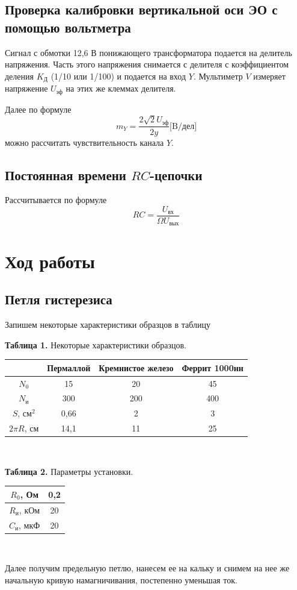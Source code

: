 \documentclass[a4paper, 12pt]{article}%
\begin{document}
\subsection*{Проверка калибровки вертикальной оси ЭО с помощью вольтметра}
Сигнал с обмотки 12,6 В понижающего трансформатора подается на делитель напряжения. Часть этого напряжения снимается с делителя с коэффициентом деления $K_{\text{Д}}$ (1/10 или 1/100) и подается на вход $Y$. Мультиметр $V$ измеряет напряжение $U_{\text{эф}}$ на этих же клеммах делителя.

Далее по формуле 
\begin{equation}
m_Y = \dfrac{2\sqrt{2}U_{\text{эф}}}{2y} \text{[B/дел]}
\end{equation}
можно рассчитать чувствительность канала $Y$.
\subsection*{Постоянная времени $RC$-цепочки}
Рассчитывается по формуле 
\begin{equation}
RC = \dfrac{U_{\text{вх}}}{\Omega U_{\text{вых}}}
\end{equation}
\section*{Ход работы}
\subsection*{Петля гистерезиса}
Запишем некоторые характеристики образцов в таблицу
\begin{center}
\textbf{Таблица 1.} Некоторые характеристики образцов.
\begin{tabular}{|c|c|c|c|}
\hline
 & Пермаллой & Кремнистое железо & Феррит 1000нн \\ \hline
$N_0$ & 15 & 20 & 45 \\ \hline
$N_{\text{и}}$ & 300 & 200 & 400 \\ \hline
$S$, см$^2$ & 0,66 & 2 & 3 \\ \hline
$2\pi R$, см & 14,1 & 11 & 25 \\ \hline
\end{tabular}\\
\end{center}
\begin{center}
\textbf{Таблица 2.} Параметры установки.
\begin{tabular}{|c|c|}
\hline
$R_0$, Ом & 0,2 \\ \hline
$R_{\text{и}}$, кОм & 20 \\ \hline
$C_{\text{и}}$, мкФ & 20 \\ \hline
\end{tabular}\\
\end{center}
Далее получим предельную петлю, нанесем ее на кальку и снимем на нее же начальную кривую намагничивания, постепенно уменьшая ток.
\end{document}
